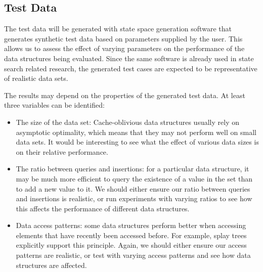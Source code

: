 \documentclass{acm_proc_article-sp}
\begin{document}
\subsection{Test Data}
The test data will be generated with state space generation software that generates synthetic test data based on parameters supplied by the user. This allows us to assess the effect of varying parameters on the performance of the data structures being evaluated. Since the same software is already used in state search related research, the generated test cases are expected to be representative of realistic data sets.

The results may depend on the properties of the generated test data. At least three variables can be identified:
\begin{itemize}
\item The size of the data set: Cache-oblivious data structures usually rely on asymptotic optimality, which means that they may not perform well on small data sets. It would be interesting to see what the effect of various data sizes is on their relative performance.
\item The ratio between queries and insertions: for a particular data structure, it may be much more efficient to query the existence of a value in the set than to add a new value to it. We should either ensure our ratio between queries and insertions is realistic, or run experiments with varying ratios to see how this affects the performance of different data structures.
\item Data access patterns: some data structures perform better when accessing elements that have recently been accessed before. For example, splay trees explicitly support this principle. Again, we should either ensure our access patterns are realistic, or test with varying access patterns and see how data structures are affected.
\end{itemize}
\end{document}

